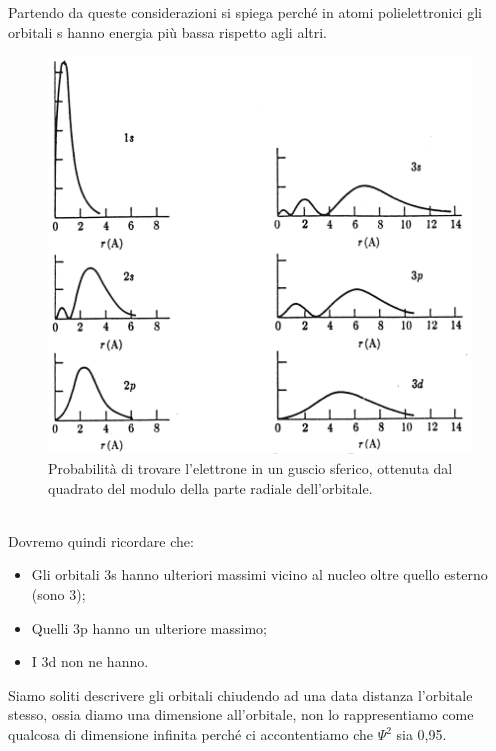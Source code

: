Partendo da queste considerazioni si spiega perché in atomi polielettronici gli orbitali s hanno energia più bassa rispetto agli altri.
\begin{figure}[htp]
  \centering
  \includegraphics[width=16cm]{immagini/picchi.png}
  \caption{Probabilità di trovare l'elettrone in un guscio sferico, ottenuta dal
  quadrato del modulo della parte radiale dell'orbitale.}
\end{figure}\\
Dovremo quindi ricordare che:
\begin{itemize}
  \item Gli orbitali 3s hanno ulteriori massimi vicino al nucleo oltre quello esterno (sono 3);
  \item Quelli 3p hanno un ulteriore massimo;
  \item I 3d non ne hanno.
\end{itemize}
Siamo soliti descrivere gli orbitali chiudendo ad una data distanza l'orbitale stesso, ossia diamo una dimensione all'orbitale, non lo rappresentiamo come qualcosa di dimensione infinita perché ci accontentiamo che $\Psi^2$ sia 0,95.
